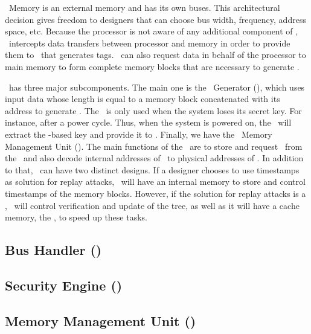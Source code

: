 \ptag~Memory is an external memory and has its own buses. This architectural decision gives freedom to designers that can choose bus width, frequency, address space, etc. Because the processor is not aware of any additional component of \cshia, \handler~intercepts data transfers between processor and memory in order to provide them to \seceng~that generates tags. \handler~can also request data in behalf of the processor to main memory to form complete memory blocks that are necessary to generate \ptags.

\seceng~has three major subcomponents. The main one is the \ptag~Generator (\ptaggen), which uses input data whose length is equal to a memory block concatenated with its address to generate \ptags. The \fuzzy~is only used when the system loses its secret key. For instance, after a power cycle. Thus, when the system is powered on, the \fuzzy~will extract the \puf-based key and provide it to \ptaggen. Finally, we have the \ptag~Memory Management Unit (\pmmu). The main functions of the \pmmu~are to store and request \ptags~from the \ptagmem~and also decode internal addresses of \ptags~to physical addresses of \ptagmem. In addition to that, \pmmu~can have two distinct designs. If a designer chooses to use timestamps as solution for replay attacks, \pmmu~will have an internal memory to store and control timestamps of the memory blocks. However, if the solution for replay attacks is a \mt, \pmmu~will control verification and update of the tree, as well as it will have a cache memory, the \ptagcache, to speed up these tasks.


\subsection{Bus Handler (\handler)}
\label{subsec:handler}
\lorenipsuns
\subsection{Security Engine (\seceng)}
\label{subsec:seceng}
\lorenipsuns

\subsection{Memory Management Unit (\pmmu)}
\label{subsec:pmmu}
\lorenipsuns

\subsection{\ptagmem}
\label{subsec:ptagmem}
\lorenipsuns



